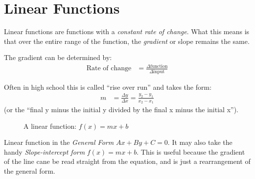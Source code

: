 %
\clearpage
\section{Linear Functions}
\label{sec:LinearFunctions}
Linear functions are functions with a \emph{constant rate of change}. What this
means is that over the entire range of the function, the \emph{gradient} or
slope remains the same.

The gradient can be determined by:
\begin{align}
  \text{Rate of change} & = \frac{\Delta\text{function}}{\Delta\text{input}}
\end{align}

Often in high school this is called ``rise over run'' and takes the form:
\begin{align}
  m & = \frac{\Delta y}{\Delta x}  = \frac{y_2 - y_1}{x_2 - x_1}
\end{align}
(or the ``final y minus the initial y divided by the final x minus the initial
x'').

\begin{figure}[!hbt]
\label{fig:FuncGraphLinear}
\caption{A linear function: $f(x) = mx + b$}
\end{figure}

%
Linear function in the \emph{General Form} $Ax + By + C= 0$. It may also take
the handy \emph{Slope-intercept form} $ f(x) = mx + b $. This is useful because
the gradient of the line cane be read straight from the equation, and is just
a rearrangement of the general form.

